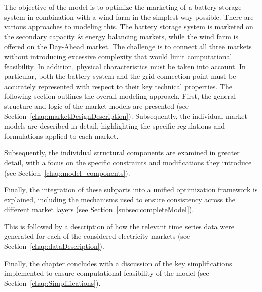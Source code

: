 The objective of the model is to optimize the marketing of a battery storage system in combination with a wind farm in the simplest way possible.
There are various approaches to modeling this. The battery storage system is marketed on the secondary capacity \& energy balancing markets,
while the wind farm is offered on the Day-Ahead market.
The challenge is to connect all three markets without introducing excessive complexity that would limit computational feasibility.
In addition, physical characteristics must be taken into account.
In particular, both the battery system and the grid connection point
must be accurately represented with respect to their key technical properties.
The following section outlines the overall modeling approach.
First, the general structure and logic of the market models are presented (see Section~\ref{chap:marketDesignDescription}).
Subsequently, the individual market models are described in detail,
highlighting the specific regulations and formulations applied to each market.

Subsequently, the individual structural components are examined in greater detail,
with a focus on the specific constraints and modifications they introduce (see Section~\ref{chap:model_components}).

Finally, the integration of these subparts into a unified optimization framework
is explained, including the mechanisms used to ensure consistency
across the different market layers (see Section~\ref{subsec:completeModel}).

This is followed by a description of how the relevant time series data
were generated for each of the considered electricity markets (see Section~\ref{chap:dataDescription}).

Finally, the chapter concludes with a discussion of the key simplifications
implemented to ensure computational feasibility of the model (see Section~\ref{chap:Simplifications}).

